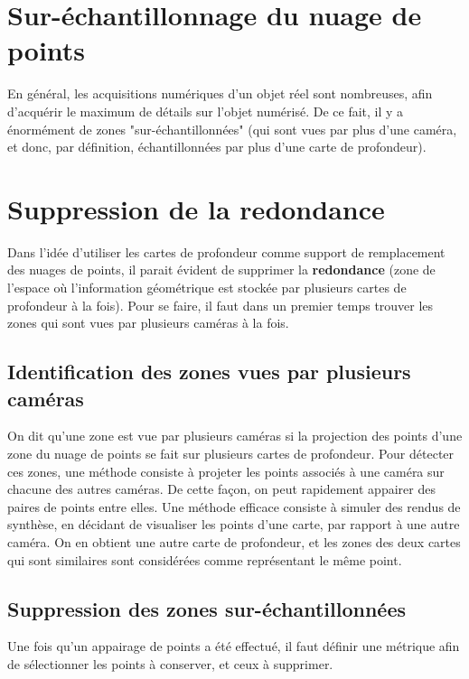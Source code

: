 \documentclass{report}
\begin{document}
\section{Sur-échantillonnage du nuage de points}

En général, les acquisitions numériques d'un objet réel sont nombreuses, afin d'acquérir le maximum de détails sur l'objet numérisé.
De ce fait, il y a énormément de zones "sur-échantillonnées" (qui sont vues par plus d'une caméra, et donc, par définition, échantillonnées par plus d'une carte de profondeur).

\section{Suppression de la redondance}

Dans l'idée d'utiliser les cartes de profondeur comme support de remplacement des nuages de points, il parait évident de supprimer la \textbf{redondance} (zone de l'espace où l'information géométrique est stockée par plusieurs cartes de profondeur à la fois).
Pour se faire, il faut dans un premier temps trouver les zones qui sont vues par plusieurs caméras à la fois.

\subsection{Identification des zones vues par plusieurs caméras}

On dit qu'une zone est vue par plusieurs caméras si la projection des points d'une zone du nuage de points se fait sur plusieurs cartes de profondeur.
Pour détecter ces zones, une méthode consiste à projeter les points associés à une caméra sur chacune des autres caméras.
De cette façon, on peut rapidement appairer des paires de points entre elles.
Une méthode efficace consiste à simuler des rendus de synthèse, en décidant de visualiser les points d'une carte, par rapport à une autre caméra.
On en obtient une autre carte de profondeur, et les zones des deux cartes qui sont similaires sont considérées comme représentant le même point.

\subsection{Suppression des zones sur-échantillonnées}

Une fois qu'un appairage de points a été effectué, il faut définir une métrique afin de sélectionner les points à conserver, et ceux à supprimer.
\end{document}
